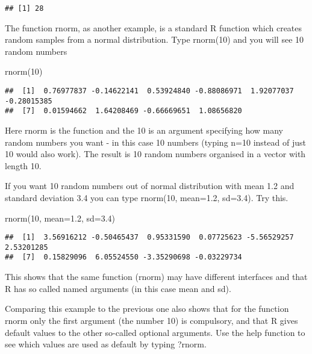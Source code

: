 \documentclass[
]{article}
\newenvironment{Shaded}{\begin{snugshade}}{\end{snugshade}}
\newcommand{\AttributeTok}[1]{\textcolor[rgb]{0.77,0.63,0.00}{#1}}
\newcommand{\DecValTok}[1]{\textcolor[rgb]{0.00,0.00,0.81}{#1}}
\newcommand{\FloatTok}[1]{\textcolor[rgb]{0.00,0.00,0.81}{#1}}
\newcommand{\FunctionTok}[1]{\textcolor[rgb]{0.00,0.00,0.00}{#1}}
\newcommand{\NormalTok}[1]{#1}
\begin{document}
\begin{verbatim}
## [1] 28
\end{verbatim}

The function rnorm, as another example, is a standard R function which
creates random samples from a normal distribution. Type rnorm(10) and
you will see 10 random numbers

\begin{Shaded}
\begin{Highlighting}[]
\FunctionTok{rnorm}\NormalTok{(}\DecValTok{10}\NormalTok{)}
\end{Highlighting}
\end{Shaded}

\begin{verbatim}
##  [1]  0.76977837 -0.14622141  0.53924840 -0.88086971  1.92077037 -0.28015385
##  [7]  0.01594662  1.64208469 -0.66669651  1.08656820
\end{verbatim}

Here rnorm is the function and the 10 is an argument specifying how many
random numbers you want - in this case 10 numbers (typing n=10 instead
of just 10 would also work). The result is 10 random numbers organised
in a vector with length 10.

If you want 10 random numbers out of normal distribution with mean 1.2
and standard deviation 3.4 you can type rnorm(10, mean=1.2, sd=3.4). Try
this.

\begin{Shaded}
\begin{Highlighting}[]
\FunctionTok{rnorm}\NormalTok{(}\DecValTok{10}\NormalTok{, }\AttributeTok{mean=}\FloatTok{1.2}\NormalTok{, }\AttributeTok{sd=}\FloatTok{3.4}\NormalTok{)}
\end{Highlighting}
\end{Shaded}

\begin{verbatim}
##  [1]  3.56916212 -0.50465437  0.95331590  0.07725623 -5.56529257  2.53201285
##  [7]  0.15829096  6.05524550 -3.35290698 -0.03229734
\end{verbatim}

This shows that the same function (rnorm) may have different interfaces
and that R has so called named arguments (in this case mean and sd).

Comparing this example to the previous one also shows that for the
function rnorm only the first argument (the number 10) is compulsory,
and that R gives default values to the other so-called optional
arguments. Use the help function to see which values are used as default
by typing ?rnorm.
\end{document}
